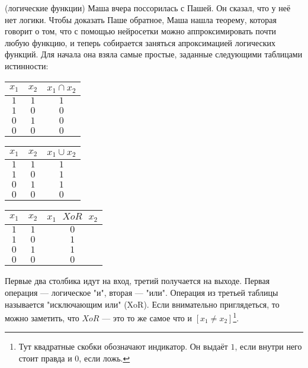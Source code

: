 \documentclass[12pt, a4paper, oneside]{article}
\theoremstyle{plain} %
\theoremstyle{definition}
\begin{document}
\begin{problem}{(логические функции)}
	Маша вчера поссорилась с Пашей. Он сказал, что у неё нет логики. Чтобы доказать Паше обратное, Маша нашла теорему, которая говорит о том, что с помощью нейросетки можно аппроксимировать почти любую функцию, и теперь собирается заняться апроксимацией логических функций. Для начала она взяла самые простые, заданные следующими таблицами истинности:
	
	\begin{center}
		\begin{minipage}{0.3\linewidth} 
			\begin{tabular}{c|c|c}
				$x_1$ & $x_2$ & $x_1 \cap x_2$ \\
				\hline 
				$1$ & $1$ & $1$ \\
				\hline 
				$1$ & $0$ & $0$ \\
				\hline 
				$0$ & $1$ & $0$ \\
				\hline 
				$0$ & $0$ & $0$ \\
			\end{tabular}
		\end{minipage}
		\hfill
		\begin{minipage}{0.3\linewidth}
			\begin{tabular}{c|c|c}
				$x_1$ & $x_2$ & $x_1 \cup x_2$ \\
				\hline 
				$1$ & $1$ & $1$ \\
				\hline 
				$1$ & $0$ & $1$ \\
				\hline 
				$0$ & $1$ & $1$ \\
				\hline 
				$0$ & $0$ & $0$ \\
			\end{tabular}
		\end{minipage}
		\hfill
		\begin{minipage}{0.3\linewidth}
			\begin{tabular}{c|c|c}
				$x_1$ & $x_2$ & $x_1 \mbox{ } XoR \mbox{ } x_2$ \\
				\hline 
				$1$ & $1$ & $0$ \\
				\hline 
				$1$ & $0$ & $1$ \\
				\hline 
				$0$ & $1$ & $1$ \\
				\hline 
				$0$ & $0$ & $0$ \\
			\end{tabular}
		\end{minipage}
	\end{center}
	
	Первые два столбика идут на вход, третий получается на выходе. Первая операция --- логическое "и", вторая --- "или".   Операция из третьей таблицы называется "исключающим или" (XoR). Если внимательно приглядеться, то можно заметить, что $XoR$ --- это то же самое что и $[x_1 \ne x_2]$\footnote{Тут квадратные скобки обозначают индикатор. Он выдаёт $1$, если внутри него стоит правда и $0$, если ложь.}. 
\end{problem}
\end{document}
